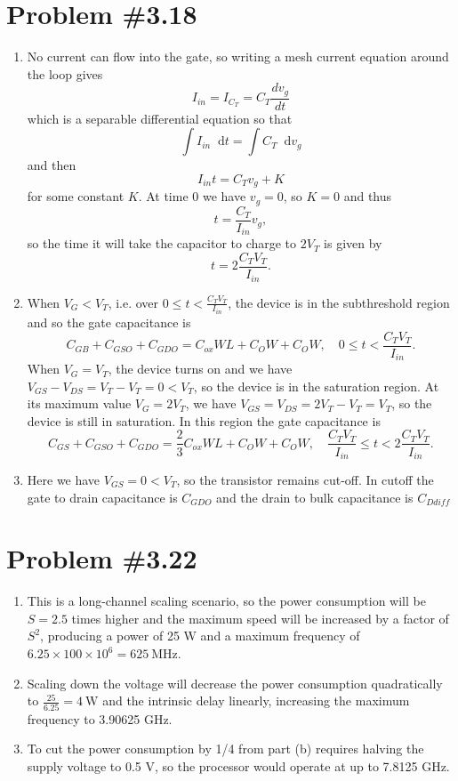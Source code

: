 \documentclass{article}
\newcommand\dif{\mathop{}\!\mathrm{d}}
\begin{document}
\section*{Problem \#3.18}
\begin{enumerate}[label=(\alph*)]
  \item{
    No current can flow into the gate, so writing a mesh current
    equation around the loop gives
    $$
    I_{in} = I_{C_T} = C_T \frac{dv_g}{dt}
    $$
    which is a separable differential equation so that
    $$
    \int I_{in} \dif t = \int C_T \dif v_g
    $$
    and then
    $$
    I_{in} t = C_T v_g + K
    $$
    for some constant $K$. At time 0 we have $v_g = 0$, so $K = 0$ and thus
    $$
    t = \frac{C_T}{I_{in}} v_g,
    $$
    so the time it will take the capacitor to charge to $2 V_T$ is given by
    $$
    t = 2\frac{C_T V_T}{I_{in}}.
    $$
  }
  \item{
    When $V_G < V_T$, i.e. over $0 \leq t < \frac{C_T V_T}{I_{in}}$,
    the device is in the subthreshold region and so the gate capacitance
    is
    $$
    C_{GB} + C_{GSO} + C_{GDO} = C_{ox} WL + C_O W + C_O W, \quad
    0 \leq t < \frac{C_T V_T}{I_{in}}.
    $$
    When $V_G = V_T$, the device turns on and we have $V_{GS} - V_{DS} = V_T - V_T = 0 < V_T$,
    so the device is in the saturation region. At its maximum value $V_G = 2 V_T$, we have
    $V_{GS} = V_{DS} = 2 V_T - V_T = V_T$, so the device is still in saturation. In this region
    the gate capacitance is
    $$
    C_{GS} + C_{GSO} + C_{GDO} = \frac{2}{3}C_{ox} W L + C_O W + C_O W, \quad
    \frac{C_T V_T}{I_{in}} \leq t < 2\frac{C_T V_T}{I_{in}}.
    $$
  }
  \item{
    Here we have $V_{GS} = 0 < V_T$, so the transistor remains cut-off.
    In cutoff the gate to drain capacitance is $C_{GDO}$ and the drain
    to bulk capacitance is $C_{Ddiff}$
  }
\end{enumerate}

\section*{Problem \#3.22}
\begin{enumerate}[label=(\alph*)]
  \item{
    This is a long-channel scaling scenario, so the
    power consumption will be $S = 2.5$ times higher
    and the maximum speed will be increased by a factor of $S^2$,
    producing a power of 25 W and a maximum frequency of
    $6.25 \times 100 \times 10^6 = 625 ~\mathrm{MHz}$.
  }
  \item{
    Scaling down the voltage will decrease the power consumption
    quadratically to $\frac{25}{6.25} = 4~\mathrm{W}$ and the
    intrinsic delay linearly, increasing the maximum frequency
    to 3.90625 GHz.
  }
  \item{
    To cut the power consumption by 1/4 from part (b) requires
    halving the supply voltage to 0.5 V, so the processor would
    operate at up to 7.8125 GHz.
  }
\end{enumerate}
\end{document}
